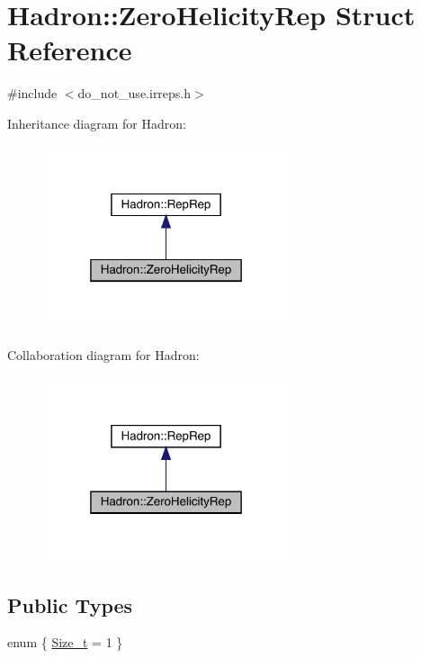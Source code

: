\hypertarget{structHadron_1_1ZeroHelicityRep}{}\section{Hadron\+:\+:Zero\+Helicity\+Rep Struct Reference}
\label{structHadron_1_1ZeroHelicityRep}


{\ttfamily \#include $<$do\+\_\+not\+\_\+use.\+irreps.\+h$>$}



Inheritance diagram for Hadron\+:\nopagebreak
\begin{figure}[H]
\begin{center}
\leavevmode
\includegraphics[width=205pt]{dc/d43/structHadron_1_1ZeroHelicityRep__inherit__graph}
\end{center}
\end{figure}


Collaboration diagram for Hadron\+:\nopagebreak
\begin{figure}[H]
\begin{center}
\leavevmode
\includegraphics[width=205pt]{d1/de7/structHadron_1_1ZeroHelicityRep__coll__graph}
\end{center}
\end{figure}
\subsection*{Public Types}
\begin{DoxyCompactItemize}
\item 
enum \{ \mbox{\hyperlink{structHadron_1_1ZeroHelicityRep_aacdc790afcd692fa3a1b3dd8980bfc7ba6f7f0a44bfc6c8b00477c0c8fa069d8e}{Size\+\_\+t}} = 1
 \}
\end{DoxyCompactItemize}
